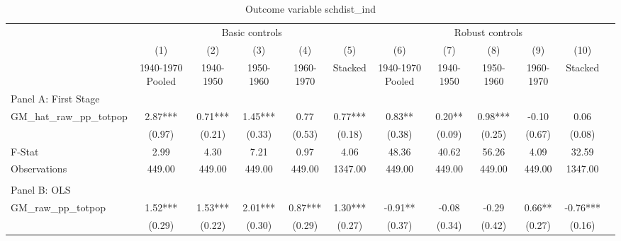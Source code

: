  \begin{table}[htbp]\centering {} \begin{threeparttable} \caption{Outcome variable schdist\_ind} \begin{tabular}{l*{11}{c}} \toprule
          &\multicolumn{5}{c}{Basic controls}                                   &\multicolumn{5}{c}{Robust controls}                                  \\\cmidrule(lr){2-6}\cmidrule(lr){7-11}
          &\multicolumn{1}{c}{(1)}&\multicolumn{1}{c}{(2)}&\multicolumn{1}{c}{(3)}&\multicolumn{1}{c}{(4)}&\multicolumn{1}{c}{(5)}&\multicolumn{1}{c}{(6)}&\multicolumn{1}{c}{(7)}&\multicolumn{1}{c}{(8)}&\multicolumn{1}{c}{(9)}&\multicolumn{1}{c}{(10)}\\
          &\multicolumn{1}{c}{1940-1970 Pooled}&\multicolumn{1}{c}{1940-1950}&\multicolumn{1}{c}{1950-1960}&\multicolumn{1}{c}{1960-1970}&\multicolumn{1}{c}{Stacked}&\multicolumn{1}{c}{1940-1970 Pooled}&\multicolumn{1}{c}{1940-1950}&\multicolumn{1}{c}{1950-1960}&\multicolumn{1}{c}{1960-1970}&\multicolumn{1}{c}{Stacked}\\
\cmidrule(lr){1-11}
\multicolumn{10}{l}{Panel A: First Stage}\\
\cmidrule(lr){1-11}
GM\_hat\_raw\_pp\_totpop&      2.87***&      0.71***&      1.45***&      0.77   &      0.77***&      0.83** &      0.20** &      0.98***&     -0.10   &      0.06   \\
          &    (0.97)   &    (0.21)   &    (0.33)   &    (0.53)   &    (0.18)   &    (0.38)   &    (0.09)   &    (0.25)   &    (0.67)   &    (0.08)   \\
\midrule
F-Stat    &      2.99   &      4.30   &      7.21   &      0.97   &      4.06   &     48.36   &     40.62   &     56.26   &      4.09   &     32.59   \\
Observations&    449.00   &    449.00   &    449.00   &    449.00   &   1347.00   &    449.00   &    449.00   &    449.00   &    449.00   &   1347.00   \\
\cmidrule[\heavyrulewidth](lr){1-11} \\ \cmidrule[\heavyrulewidth](lr){1-11}
\multicolumn{10}{l}{Panel B: OLS}\\
\cmidrule(lr){1-11}
GM\_raw\_pp\_totpop&      1.52***&      1.53***&      2.01***&      0.87***&      1.30***&     -0.91** &     -0.08   &     -0.29   &      0.66** &     -0.76***\\
          &    (0.29)   &    (0.22)   &    (0.30)   &    (0.29)   &    (0.27)   &    (0.37)   &    (0.34)   &    (0.42)   &    (0.27)   &    (0.16)   \\

\end{tabular}
\end{threeparttable}
\end{table}
